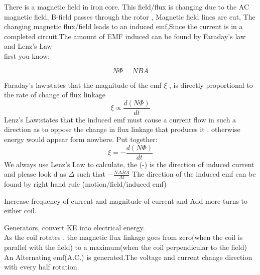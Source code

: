 \documentclass[a4paper]{article}
\begin{document}
\begin{defi}
There is a magnetic field in iron core. This field/flux is changing due to the AC magnetic field, B-field passes through the rotor , Magnetic field lines are cut, The changing magnetic flux/field leads to an induced emf,Since the current is in a completed circuit.The amount of EMF induced can be found by Faraday's law and Lenz's Law\\
first you know:
\begin{defi}
\begin{equation*}
    N\Phi=NBA
\end{equation*}
\end{defi}
\end{defi}
\begin{law}
Faraday's law:states that the magnitude of the emf $\xi$ , is directly proportional to the rate of change of flux linkage
\begin{equation*}
    \xi\varpropto\frac{d(N\Phi)}{dt}
\end{equation*}
Lenz's Law:states that the induced emf must cause a current flow in such a direction as to oppose the change in flux linkage that produces it , otherwise energy would appear form nowhere. Put together:
\begin{equation*}
   \xi=-\frac{d(N\Phi)}{dt}
\end{equation*}
We always use Lenz's Law to calculate, the (-) is the direction of induced current and please look d as $\Delta$ such that $-\frac{N\Delta BA}{\Delta t}$
The direction of the induced emf can be found by right hand rule (motion/field/induced emf)
\end{law}





\begin{prop}
Increase frequency of current and magnitude of current and Add more turns to either coil.
\end{prop}





\begin{defi}
Generators, convert KE into electrical energy.\\
As the coil rotates , the magnetic flux linkage goes from zero(when the coil is parallel with the field) to a maximum(when the coil perpendicular to the field) An Alternating emf(A.C.) is generated.The voltage and current change direction with every half rotation.
\end{defi}
\end{document}
